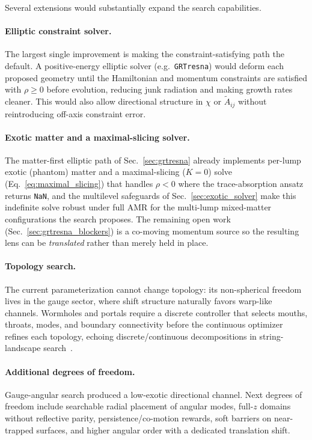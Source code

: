 \documentclass[twocolumn,floatfix,aps,prd,nofootinbib]{revtex4-2}
\begin{document}
Several extensions would substantially expand the search capabilities.

\paragraph{Elliptic constraint solver.}
The largest single improvement is making the constraint-satisfying path the default.  A positive-energy elliptic solver (e.g.\ \texttt{GRTresna}) would deform each proposed geometry until the Hamiltonian and momentum constraints are satisfied with $\rho\ge0$ before evolution, reducing junk radiation and making growth rates cleaner.  This would also allow directional structure in $\chi$ or $\tilde A_{ij}$ without reintroducing off-axis constraint error.

\paragraph{Exotic matter and a maximal-slicing solver.}
The matter-first elliptic path of Sec.~\ref{sec:grtresna} already implements
per-lump exotic (phantom) matter and a maximal-slicing ($K=0$) solve
(Eq.~\ref{eq:maximal_slicing}) that handles $\rho<0$ where the trace-absorption
ansatz returns \texttt{NaN}, and the multilevel safeguards of
Sec.~\ref{sec:exotic_solver} make this indefinite solve robust under full AMR for
the multi-lump mixed-matter configurations the search proposes.  The remaining
open work (Sec.~\ref{sec:grtresna_blockers}) is a co-moving momentum source so
the resulting lens can be \emph{translated} rather than merely held in place.

\paragraph{Topology search.}
The current parameterization cannot change topology: its non-spherical freedom lives in the gauge sector, where shift structure naturally favors warp-like channels.  Wormholes and portals require a discrete controller that selects mouths, throats, modes, and boundary connectivity before the continuous optimizer refines each topology, echoing discrete/continuous decompositions in string-landscape search~\cite{halverson2019branes}.

\paragraph{Additional degrees of freedom.}
Gauge-angular search produced a low-exotic directional channel.  Next degrees of freedom include searchable radial placement of angular modes, full-$z$ domains without reflective parity, persistence/co-motion rewards, soft barriers on near-trapped surfaces, and higher angular order with a dedicated translation shift.
\end{document}
